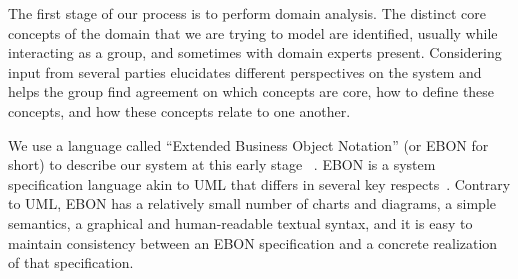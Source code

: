 \documentclass[letterpaper,twocolumn,10pt]{article}
\begin{document}
The first stage of our process is to perform domain analysis.  The
distinct core concepts of the domain that we are trying to model are
identified, usually while interacting as a group, and sometimes with
domain experts present.  Considering input from several parties
elucidates different perspectives on the system and helps the group
find agreement on which concepts are core, how to define these
concepts, and how these concepts relate to one another.

We use a language called ``Extended Business Object Notation'' (or EBON for 
short) to describe our system at this early stage ~\cite{WaldenNerson95}.  
EBON is a system specification language akin to UML that differs in several key
respects~\cite{Kiniry02-PhDThesis,Kiniry04-R0420}.
Contrary to UML, EBON has a relatively small number of charts and
diagrams, a simple semantics, a graphical and human-readable textual
syntax, and it is easy to maintain consistency between an EBON
specification and a concrete realization of that specification.
\end{document}
